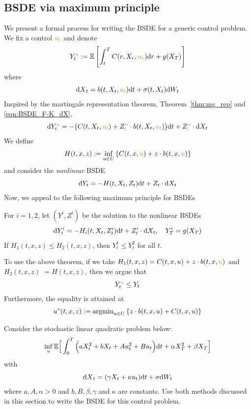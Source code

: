 \documentclass[11pt]{book}
\newcommand{\dd}{\text{\normalfont d}}
\newcommand{\dt}{\text{\normalfont d}t}
\newcommand{\dr}{\text{\normalfont d}r}
\newcommand{\dX}{\text{\normalfont d}X}
\newcommand{\dW}{\text{\normalfont d}W}
\begin{document}
\subsection{BSDE via maximum principle}
We present a formal process for writing the BSDE for a generic control problem.  We fix a control ${\color{orange}u_t}$ and denote
\[
Y^{{\color{orange}u}}_t:=\mathbb{E}\left[\int_t^T C(r,X_r,{\color{orange}u_r})\dr+g(X_T)\right]
\]
where 
\[
{\dX}_t =b(t,X_t,{\color{orange}u_t}){\dt}+\sigma(t,X_t)\dW_t
\]
Inspired by the martingale representation theorem, Theorem~\ref{thm:mg_rep} and \eqref{eqn:BSDE_F-K_dX},  
\[
\dd Y^{{\color{orange}u}}_t = - \big(C(t,X_t,{\color{orange}u_t}) + Z_t^{\color{orange}u}\cdot b(t,X_t,{\color{orange}u_t})\big) \dt + Z_t^{\color{orange}u}\cdot \dX_t
\]
We define
\[
H(t,x,z):=\inf_{u\in U}\left\{C(t,x,{\color{orange}u}) + z\cdot  b(t,x,{\color{orange}u})\right\}
\]
and consider the \emph{nonlinear} BSDE 
\begin{equation}
\label{eqn:BSDE_pre_formal}
    \dd Y_t =  - H(t,X_t,Z_t) \dt + Z_t\cdot \dd X_t
\end{equation}
Now, we appeal to the following maximum principle for BSDEs
\begin{thm}
    For $i=1,2$, let $(Y^i,Z^i)$ be the solution to the nonlinear BSDEs
    \[
    \dd Y^i_t =  - H_i(t,X_t,Z^i_t) \dt + Z^i_t\cdot \dd X_t,~~~Y^i_T=g(X_T)
    \]
    If $H_1(t,x,z)\le H_2(t,x,z)$, then $Y^1_t\le Y^2_t$ for all $t$.
\end{thm}
To use the above theorem, if we take $H_1(t,x,z)=C(t,x,u) + z\cdot  b(t,x,{\color{orange}u})$ and $H_2(t,x,z)$ $=H(t,x,z)$, then we argue that 
\[
Y^{{\color{orange}u}}_t\le Y_t
\]
Furthermore, the equality is attained at
\[
u^*(t,x,z):=\text{\normalfont argmin}_{u\in U}\left\{z\cdot b(t,x,u) + C(t,x,u)\right\}
\]
\begin{ex}
    Consider the stochastic linear quadratic problem below:
    \begin{equation}
        \inf_u\mathbb{E}\Big[\int_0^T \Big(aX_t^2+bX_t +Au_t^2 + Bu_t\Big){\dt}+\alpha X_T^2+\beta X_T\Big]
    \end{equation}
    with
    \begin{equation}
        {\dX}_t=(\gamma X_t+\kappa u_t){\dt}+\sigma \dW_t
    \end{equation}
where $a,A, \alpha>0$ and $b,B,\beta,\gamma$ and $\kappa$ are constants.
Use both methods discussed in this section to write the BSDE for this control problem.
\end{ex}
\end{document}
